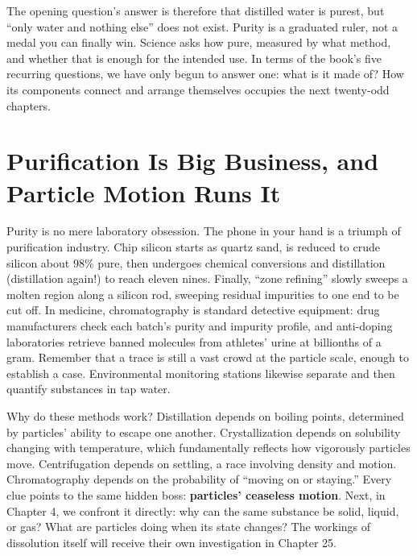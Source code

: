 The opening question's answer is therefore that distilled water is purest, but ``only water and nothing else'' does not exist. Purity is a graduated ruler, not a medal you can finally win. Science asks how pure, measured by what method, and whether that is enough for the intended use. In terms of the book's five recurring questions, we have only begun to answer one: what is it made of? How its components connect and arrange themselves occupies the next twenty-odd chapters.

\section{Purification Is Big Business, and Particle Motion Runs It}

Purity is no mere laboratory obsession. The phone in your hand is a triumph of purification industry. Chip silicon starts as quartz sand, is reduced to crude silicon about $98\%$ pure, then undergoes chemical conversions and distillation (distillation again!) to reach eleven nines. Finally, ``zone refining'' slowly sweeps a molten region along a silicon rod, sweeping residual impurities to one end to be cut off. In medicine, chromatography is standard detective equipment: drug manufacturers check each batch's purity and impurity profile, and anti-doping laboratories retrieve banned molecules from athletes' urine at billionths of a gram. Remember that a trace is still a vast crowd at the particle scale, enough to establish a case. Environmental monitoring stations likewise separate and then quantify substances in tap water.

Why do these methods work? Distillation depends on boiling points, determined by particles' ability to escape one another. Crystallization depends on solubility changing with temperature, which fundamentally reflects how vigorously particles move. Centrifugation depends on settling, a race involving density and motion. Chromatography depends on the probability of ``moving on or staying.'' Every clue points to the same hidden boss: \textbf{particles' ceaseless motion}. Next, in Chapter 4, we confront it directly: why can the same substance be solid, liquid, or gas? What are particles doing when its state changes? The workings of dissolution itself will receive their own investigation in Chapter 25.


